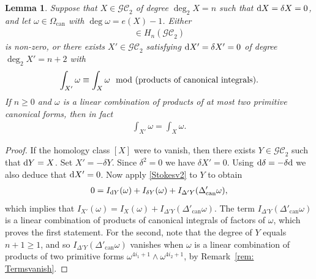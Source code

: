 \documentclass[pdftex]{sigma}%
\newtheorem{lem}[thm]{Lemma}
\numberwithin{equation}{section}
\newcommand{\GC}{\mathcal{GC}}
\newcommand{\can}{\mathrm{can}}
\newcommand{\0}{\color{blue}{\mathsf{0}}}
\begin{document}
\begin{lem} %
Suppose that $X \in \GC_2$ of degree $\deg_2 X = n$ such that ${\rm d}X = \delta X=0$, and let $\omega \in \Omega_{\can}$ with $\deg \omega = e(X)-1$. Either
\begin{gather*}
[X] \in H_n(\GC_2)
\end{gather*}
is non-zero, or there exists $X' \in \GC_2$ satisfying ${\rm d}X' = \delta X' =0$ of degree $\deg_2 X' = n+2$ with
\begin{gather*}
\int_{X'} \omega \equiv \int_{X} \omega \mod \text{\rm (products of canonical integrals)}.
\end{gather*}
If $n\geq 0$ and $\omega$ is a linear combination of products of at most two primitive canonical forms, then in fact
\begin{gather*}
\int_{X'} \omega = \int_{X} \omega.
\end{gather*}
\end{lem}
\begin{proof}
If the homology class $[X]$ were to vanish, then there exists $Y \in \GC_2$ such that ${\rm d}Y=X$. Set $X' = - \delta Y$. Since $\delta^2=0$ we have $\delta X'=0$. Using ${\rm d} \delta = - \delta {\rm d}$ we also deduce that ${\rm d}X'=0$.
Now apply \eqref{Stokesv2} to $Y$ to obtain
\begin{gather*}
0 = I_{{\rm d}Y}(\omega) + I_{\delta Y} (\omega) + I_{\Delta' Y}(\Delta'_{\can} \omega),
\end{gather*}
 which implies that $I_{X'}(\omega) = I_X(\omega) + I_{\Delta' Y}(\Delta'_{\can} \omega) $. The term $ I_{\Delta' Y}(\Delta'_{\can} \omega) $ is a linear combination of products of canonical integrals of factors of $\omega$, which proves the first statement.
 For the second, note that the degree of $Y$ equals $n+1\geq 1$, and so $ I_{\Delta' Y}(\Delta'_{\can} \omega) $ vanishes when $\omega$ is a linear combination of products of two primitive forms $\omega^{4i_1+1} \wedge \omega^{4i_2+1}$, by Remark~\ref{rem: Termsvanish}.
 \end{proof}
\end{document}
